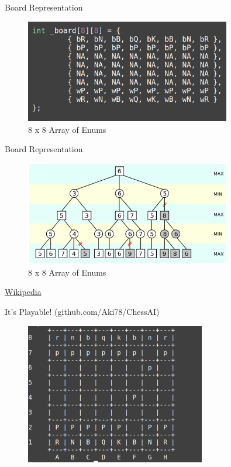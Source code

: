 \documentclass{beamer}
\begin{document}
\begin{frame}{Board Representation}
    \begin{figure}
        \centering
        \includegraphics[width=0.8\textwidth]{board_representation.png} %
        \caption{8 x 8 Array of Enums}
    \end{figure}
\end{frame}




\begin{frame}{Board Representation}
    \begin{figure}
        \centering
        \includegraphics[width=0.8\textwidth]{minimax.png} %

        \caption{8 x 8 Array of Enums}
    \end{figure}
\href{https://en.wikipedia.org/wiki/Alpha\%E2\%80\%93beta_pruning}{Wikipedia}
\end{frame}


\begin{frame}{It's Playable! (github.com/Aki78/ChessAI)}
    \begin{figure}
        \centering
        \includegraphics[width=0.7\textwidth]{playable.png} %

    \end{figure}
\end{frame}
\end{document}

